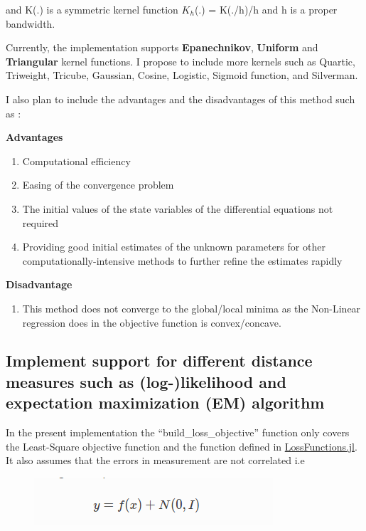 \documentclass[11pt]{article}
\makeatletter
\def\maxwidth{\ifdim\Gin@nat@width>\linewidth\linewidth
    \else\Gin@nat@width\fi}
\let\Oldincludegraphics\includegraphics
\renewcommand{\includegraphics}[1]{\Oldincludegraphics[width=.8\maxwidth]{#1}}
\providecommand{\tightlist}{%
      \setlength{\itemsep}{0pt}\setlength{\parskip}{0pt}}
\makeatother
\begin{document}
and K(.) is a symmetric kernel function \(K_{h}\)(.) = K(./h)/h and h is
a proper bandwidth.

Currently, the implementation supports \textbf{Epanechnikov},
\textbf{Uniform} and \textbf{Triangular} kernel functions. I propose to
include more kernels such as Quartic, Triweight, Tricube, Gaussian,
Cosine, Logistic, Sigmoid function, and Silverman.

I also plan to include the advantages and the disadvantages of this
method such as :

\textbf{Advantages}

\begin{enumerate}
\def\labelenumi{\arabic{enumi}.}
\tightlist
\item
  Computational efficiency
\item
  Easing of the convergence problem
\item
  The initial values of the state variables of the differential
  equations not required
\item
  Providing good initial estimates of the unknown parameters for other
  computationally-intensive methods to further refine the estimates
  rapidly
\end{enumerate}

\textbf{Disadvantage}

\begin{enumerate}
\def\labelenumi{\arabic{enumi}.}
\tightlist
\item
  This method does not converge to the global/local minima as the
  Non-Linear regression does in the objective function is
  convex/concave.
\end{enumerate}

    \subsection{Implement support for different distance measures such as
(log-)likelihood and expectation maximization (EM)
algorithm}\label{implement-support-for-different-distance-measures-such-as-log-likelihood-and-expectation-maximization-em-algorithm}

In the present implementation the ``build\_loss\_objective'' function
only covers the Least-Square objective function and the function defined
in \href{https://github.com/JuliaML/LossFunctions.jl}{LossFunctions.jl}.
It also assumes that the errors in measurement are not correlated i.e

\begin{figure}[htbp]
\centering
\includegraphics{images/Maximum_Likelihood_no_covariance.png}
\caption{}
\end{figure}
\end{document}
